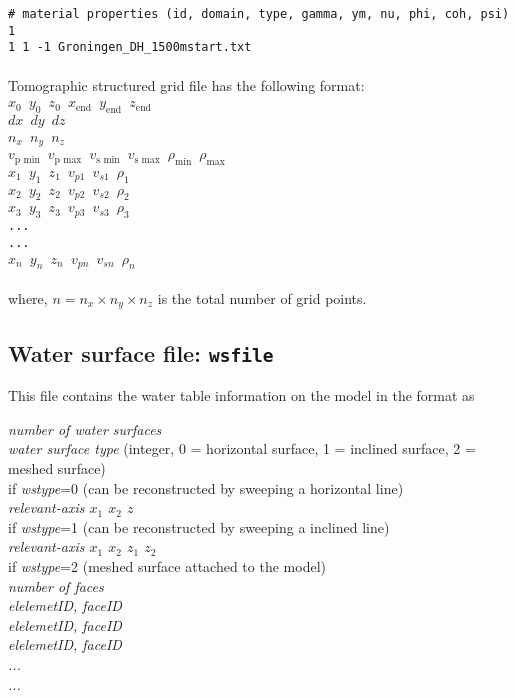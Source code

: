 \texttt{\# material properties (id, domain, type, gamma, ym, nu, phi, coh, psi)\\
1\\
1 1 -1 Groningen\_DH\_1500mstart.txt\\
}\\

Tomographic structured grid file has the following format:\\

\texttt{$x_0$ $y_0$ $z_0$ $x_\text{end}$ $y_\text{end}$ $z_\text{end}$\\
$dx$ $dy$ $dz$\\
$n_x$ $n_y$ $n_z$\\
$v_\text{p~min}$ $v_\text{p~max}$ $v_\text{s~min}$ $v_\text{s~max}$ $\rho_\text{min}$ $\rho_\text{max}$ \\
$x_1$ $y_1$ $z_1$ $v_{p1}$ $v_{s1}$ $\rho_1$\\
$x_2$ $y_2$ $z_2$ $v_{p2}$ $v_{s2}$ $\rho_2$\\
$x_3$ $y_3$ $z_3$ $v_{p3}$ $v_{s3}$ $\rho_3$\\
...\\
...\\
$x_n$ $y_n$ $z_n$ $v_{pn}$ $v_{sn}$ $\rho_n$\\
}\\

where, $n=n_x \times n_y \times n_z$ is the total number of grid points. 

\subsection{Water surface file: \texttt{wsfile}}

This file contains the water table information on the model in the format as

\emph{number of water surfaces}\\
\emph{water surface type} (integer, 0 = horizontal surface, 1 = inclined surface, 2 = meshed surface)\\
if \emph{wstype}=0 (can be reconstructed by sweeping a horizontal line)\\
  \emph{relevant-axis $x_1$ $x_2$ $z$}\\
if \emph{wstype}=1 (can be reconstructed by sweeping a inclined line)\\
  \emph{relevant-axis $x_1$ $x_2$ $z_1$ $z_2$}\\
if \emph{wstype}=2 (meshed surface attached to the model)\\
  \emph{number of faces\\
  elelemetID, faceID\\
  elelemetID, faceID\\
  elelemetID, faceID\\
  ...\\
  ...}\\

